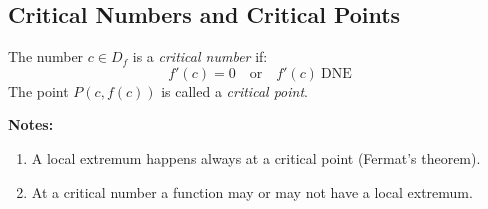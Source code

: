 \subsection{Critical Numbers and Critical Points}
	The number $c \in D_f$ is a \emph{critical number} if:
	\[f'(c) = 0 \quad \text{or} \quad f'(c)\ \mathrm{DNE}\]
	The point $P(c,f(c))$ is called a \emph{critical point}.

	\textbf{Notes:}
	\begin{enumerate}
		\item A local extremum happens always at a critical point (Fermat's theorem).
		\item At a critical number a function may or may not have a local extremum.
	\end{enumerate}
